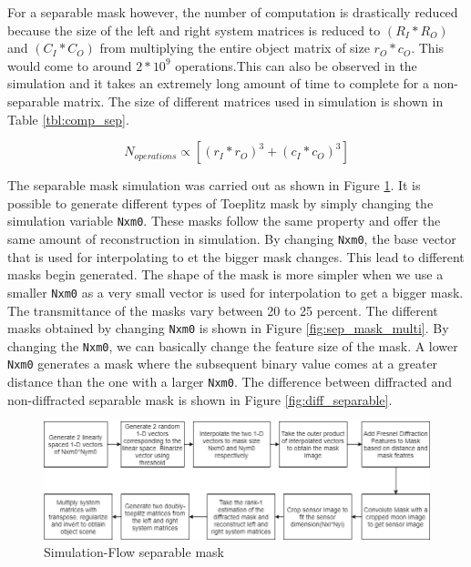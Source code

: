 For a separable mask however, the number of computation is drastically reduced because the size of the left and right system matrices is reduced to $(R_I*R_O)$ and $(C_I*C_O)$ from multiplying the entire object matrix of size $r_O*c_O$. This would come to around $2*10^9$ operations.This can also be observed in the simulation and it takes an extremely long amount of time to complete for a non-separable matrix. The size of different matrices used in simulation is shown in Table \ref{tbl:comp_sep}.

\begin{equation}
N_{operations} \propto [(r_I*r_O)^3 + (c_I*c_O)^3] 
\label{eq:sep_comp}
\end{equation}

The separable mask simulation was carried out as shown in Figure \ref{fig:sep_sim}. It is possible to generate different types of Toeplitz mask by simply changing the simulation variable \texttt{Nxm0}. These masks follow the same property and offer the same amount of reconstruction in simulation. By changing \texttt{Nxm0}, the base vector that is used for interpolating to et the bigger mask changes. This lead to different masks begin generated. The shape of the mask is more simpler when we use a smaller \texttt{Nxm0} as a very small vector is used for interpolation to get a bigger mask. The transmittance of the masks vary between 20 to 25 percent. The different masks obtained by changing \texttt{Nxm0} is shown in Figure \ref{fig:sep_mask_multi}. By changing the \texttt{Nxm0}, we can basically change the feature size of the mask. A lower \texttt{Nxm0} generates a mask where the subsequent binary value comes at a greater distance than the one with a larger \texttt{Nxm0}.
The difference between diffracted and non-diffracted separable mask is shown in Figure \ref{fig:diff_separable}.
\begin{figure}[ht]
\includegraphics[scale = 0.50]{pics/sep_mask_sim_flow}
\caption{Simulation-Flow separable mask}
\label{fig:sep_sim}
\end{figure}
